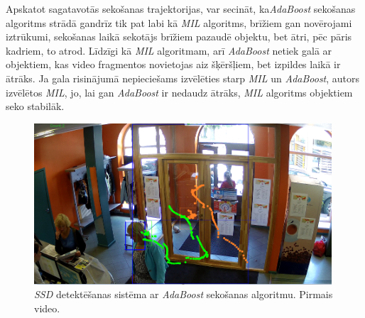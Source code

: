 Apskatot sagatavotās sekošanas trajektorijas, var secināt, ka\textit{AdaBoost} sekošanas algoritms strādā gandrīz tik pat labi kā \textit{MIL} algoritms, brīžiem gan novērojami iztrūkumi, sekošanas laikā sekotājs brīžiem pazaudē objektu, bet ātri, pēc pāris kadriem, to atrod. Līdzīgi kā \textit{MIL} algoritmam, arī \textit{AdaBoost} netiek galā ar objektiem, kas video fragmentos novietojas aiz šķēršļiem, bet izpildes laikā ir ātrāks. Ja gala risinājumā nepieciešams izvēlēties starp \textit{MIL} un \textit{AdaBoost}, autors izvēlētos \textit{MIL}, jo, lai gan \textit{AdaBoost} ir nedaudz ātrāks, \textit{MIL} algoritms objektiem seko stabilāk.
\begin{figure}[h]%
	\centering
	\includegraphics[height=6cm]{images/ssd7.png} %
	\caption{\textit{SSD} detektēšanas sistēma ar \textit{AdaBoost} sekošanas algoritmu. Pirmais video.}%
	\label{fig:example}%
\end{figure}
